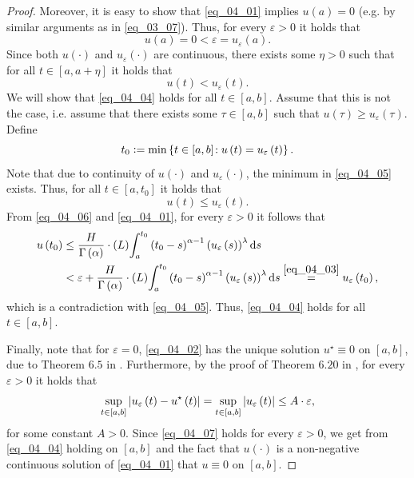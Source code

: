 \documentclass[reqno]{amsart}
\numberwithin{equation}{section}
\theoremstyle{definition}
\theoremstyle{remark}
\newcommand{\br}[1]{\left(#1\right)}
\newcommand{\cbr}[1]{\left\{#1\right\}}
\newcommand{\defeq}{\vcentcolon=}
\newcommand{\ds}{\mathrm{d}s}
\newcommand{\eps}{\varepsilon}
\newcommand{\eqText}[1]{\stackrel{#1}{=}}
\newcommand{\Lint}[3]{\br{L}\!\displaystyle\int_{#1}^{#2}{#3}}
\newcommand{\sbr}[1]{\left[#1\right]}
\newcommand{\st}{\!:}
\newcommand{\su}{u^{\star}}
\begin{document}
\begin{proof}
	Moreover, it is easy to show that \eqref{eq_04_01} implies $u\br{a}=0$ (e.g. by similar arguments as in \eqref{eq_03_07}). Thus, for every $\eps>0$ it holds that
	\begin{equation*}
		u\br{a}=0<\eps=u_{\eps}\br{a}.
	\end{equation*}
	Since both $u\br{\cdot}$ and $u_{\eps}\br{\cdot}$ are continuous, there exists some $\eta>0$ such that for all $t\in\sbr{a,a+\eta}$ it holds that
	\begin{equation}\label{eq_04_04}
		u\br{t}<u_{\eps}\br{t}.
	\end{equation}
	We will show that \eqref{eq_04_04} holds for all $t\in\sbr{a,b}$. Assume that this is not the case, i.e. assume that there exists some $\tau\in\sbr{a,b}$ such that ${u}\br{\tau}\geq{u}_{\eps}\br{\tau}$. Define
	\begin{equation}\label{eq_04_05}
		t_0\defeq\min\cbr{t\in\sbr{a,b}\st{u}\br{t}=u_{\eps}\br{t}}.
	\end{equation}
	Note that due to continuity of $u\br{\cdot}$ and $u_{\eps}\br{\cdot}$, the minimum in \eqref{eq_04_05} exists. Thus, for all $t\in\sbr{a,t_0}$ it holds that
	\begin{equation}\label{eq_04_06}
		u\br{t}\leq{u}_{\eps}\br{t}.
	\end{equation}
	From \eqref{eq_04_06} and \eqref{eq_04_01}, for every $\eps>0$ it follows that
	\begin{equation*}
		\begin{aligned}
			u\br{t_0}&\leq\frac{H}{\Gamma\br{\alpha}}\cdot\Lint{a}{t_0}{\br{t_0-s}^{\alpha-1}\br{u_{\eps}\br{s}}^{\lambda}\ds}\\
			&<\eps+\frac{H}{\Gamma\br{\alpha}}\cdot\Lint{a}{t_0}{\br{t_0-s}^{\alpha-1}\br{u_{\eps}\br{s}}^{\lambda}\ds}\eqText{\eqref{eq_04_03}}u_{\eps}\br{t_0},
		\end{aligned}
	\end{equation*}
	which is a contradiction with \eqref{eq_04_05}. Thus, \eqref{eq_04_04} holds for all $t\in\sbr{a,b}$.
	
	Finally, note that for $\eps=0$, \eqref{eq_04_02} has the unique solution $\su\equiv0$ on $\sbr{a,b}$, due to Theorem $6.5$ in \cite{Diethelm}. Furthermore, by the proof of Theorem $6.20$ in \cite{Diethelm}, for every $\eps>0$ it holds that
	\begin{equation}\label{eq_04_07}
		\sup_{t\in\sbr{a,b}}\abs{u_{\eps}\br{t}-\su\br{t}}=\sup_{t\in\sbr{a,b}}\abs{u_{\eps}\br{t}}\leq{A}\cdot\eps,
	\end{equation}
	for some constant $A>0$. Since \eqref{eq_04_07} holds for every $\eps>0$, we get from \eqref{eq_04_04} holding on $\sbr{a,b}$ and the fact that $u\br{\cdot}$ is a non-negative continuous solution of \eqref{eq_04_01} that $u\equiv0$ on $\sbr{a,b}$.
	\end{proof}
\end{document}
